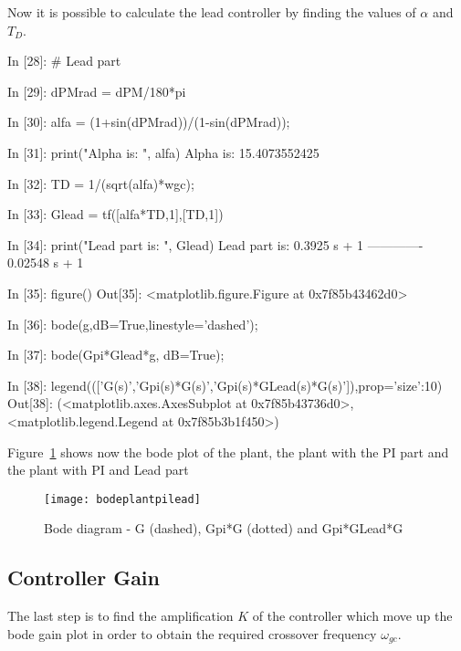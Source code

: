 Now it is possible to calculate the lead controller by finding the values of 
$\alpha$ and $T_D$.

\begin{code}
In [28]: # Lead part

In [29]: dPMrad = dPM/180*pi

In [30]: alfa = (1+sin(dPMrad))/(1-sin(dPMrad));

In [31]: print("Alpha is: ", alfa)
Alpha is:  15.4073552425

In [32]: TD = 1/(sqrt(alfa)*wgc);

In [33]: Glead = tf([alfa*TD,1],[TD,1])

In [34]: print("Lead part is: ", Glead)
Lead part is:  
 0.3925 s + 1
-------------
0.02548 s + 1


In [35]: figure()
Out[35]: <matplotlib.figure.Figure at 0x7f85b43462d0>

In [36]: bode(g,dB=True,linestyle='dashed');

In [37]: bode(Gpi*Glead*g, dB=True);

In [38]: 
legend((['G(s)','Gpi(s)*G(s)','Gpi(s)*GLead(s)*G(s)']),prop={'size':10})
Out[38]: 
(<matplotlib.axes.AxesSubplot at 0x7f85b43736d0>,
 <matplotlib.legend.Legend at 0x7f85b3b1f450>)
\end{code}

Figure~\ref{F12} shows now the bode plot of the plant, the plant with the PI 
part and the plant with PI and Lead part

\begin{figure}[htbp]	%
\centering
\texttt{[image: bodeplantpilead]}
\caption{Bode diagram - G (dashed), Gpi*G (dotted) and Gpi*GLead*G}
\label{F12}
\end{figure}

\subsection{Controller Gain}

The last step is to find the amplification $K$ of the controller which move up 
the bode gain plot in order to obtain the required crossover frequency 
$\omega_{gc}$.

